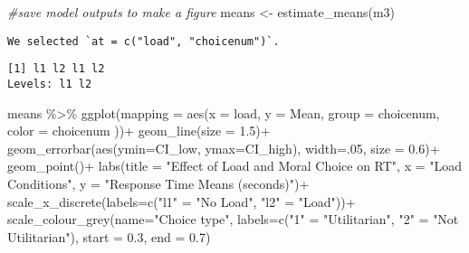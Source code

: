 \documentclass[
]{article}
\newenvironment{Shaded}{\begin{snugshade}}{\end{snugshade}}
\newcommand{\AttributeTok}[1]{\textcolor[rgb]{0.77,0.63,0.00}{#1}}
\newcommand{\CommentTok}[1]{\textcolor[rgb]{0.56,0.35,0.01}{\textit{#1}}}
\newcommand{\DecValTok}[1]{\textcolor[rgb]{0.00,0.00,0.81}{#1}}
\newcommand{\FloatTok}[1]{\textcolor[rgb]{0.00,0.00,0.81}{#1}}
\newcommand{\FunctionTok}[1]{\textcolor[rgb]{0.00,0.00,0.00}{#1}}
\newcommand{\NormalTok}[1]{#1}
\newcommand{\OtherTok}[1]{\textcolor[rgb]{0.56,0.35,0.01}{#1}}
\newcommand{\SpecialCharTok}[1]{\textcolor[rgb]{0.00,0.00,0.00}{#1}}
\newcommand{\StringTok}[1]{\textcolor[rgb]{0.31,0.60,0.02}{#1}}
\begin{document}
\begin{Shaded}
\begin{Highlighting}[]
\CommentTok{\#save model outputs to make a figure}
\NormalTok{means }\OtherTok{\textless{}{-}} \FunctionTok{estimate\_means}\NormalTok{(m3)}
\end{Highlighting}
\end{Shaded}

\begin{verbatim}
We selected `at = c("load", "choicenum")`.
\end{verbatim}

\begin{Shaded}
\end{Shaded}

\begin{verbatim}
[1] l1 l2 l1 l2
Levels: l1 l2
\end{verbatim}

\begin{Shaded}
\begin{Highlighting}[]
\NormalTok{means }\SpecialCharTok{\%\textgreater{}\%} 
  \FunctionTok{ggplot}\NormalTok{(}\AttributeTok{mapping =} \FunctionTok{aes}\NormalTok{(}\AttributeTok{x =}\NormalTok{ load,}
                       \AttributeTok{y =}\NormalTok{ Mean,}
                       \AttributeTok{group =}\NormalTok{ choicenum,}
                       \AttributeTok{color =}\NormalTok{ choicenum}
\NormalTok{                        ))}\SpecialCharTok{+}
  \FunctionTok{geom\_line}\NormalTok{(}\AttributeTok{size =} \FloatTok{1.5}\NormalTok{)}\SpecialCharTok{+}
  \FunctionTok{geom\_errorbar}\NormalTok{(}\FunctionTok{aes}\NormalTok{(}\AttributeTok{ymin=}\NormalTok{CI\_low, }\AttributeTok{ymax=}\NormalTok{CI\_high), }\AttributeTok{width=}\NormalTok{.}\DecValTok{05}\NormalTok{, }\AttributeTok{size =} \FloatTok{0.6}\NormalTok{)}\SpecialCharTok{+}
  \FunctionTok{geom\_point}\NormalTok{()}\SpecialCharTok{+}
  \FunctionTok{labs}\NormalTok{(}\AttributeTok{title =} \StringTok{"Effect of Load and Moral Choice on RT"}\NormalTok{,}
       \AttributeTok{x =} \StringTok{"Load Conditions"}\NormalTok{,}
       \AttributeTok{y =} \StringTok{"Response Time Means (seconds)"}\NormalTok{)}\SpecialCharTok{+}
  \FunctionTok{scale\_x\_discrete}\NormalTok{(}\AttributeTok{labels=}\FunctionTok{c}\NormalTok{(}\StringTok{"l1"} \OtherTok{=} \StringTok{"No Load"}\NormalTok{,}
                            \StringTok{"l2"} \OtherTok{=} \StringTok{"Load"}\NormalTok{))}\SpecialCharTok{+}
  \FunctionTok{scale\_colour\_grey}\NormalTok{(}\AttributeTok{name=}\StringTok{"Choice type"}\NormalTok{,}
                  \AttributeTok{labels=}\FunctionTok{c}\NormalTok{(}\StringTok{"1"} \OtherTok{=} \StringTok{"Utilitarian"}\NormalTok{,}
                           \StringTok{"2"} \OtherTok{=} \StringTok{"Not Utilitarian"}\NormalTok{),}
                  \AttributeTok{start =} \FloatTok{0.3}\NormalTok{,}
                  \AttributeTok{end =} \FloatTok{0.7}\NormalTok{)}
\end{Highlighting}
\end{Shaded}
\end{document}

